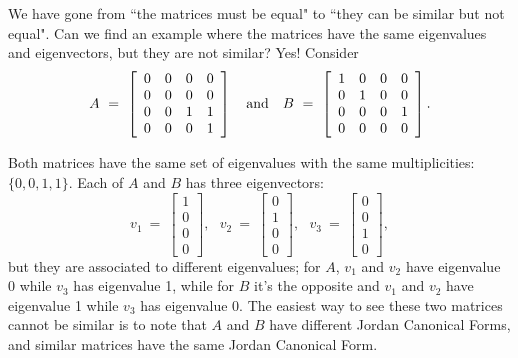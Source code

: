 \documentclass{article}
\newcommand{\vect}[1]{#1}%
\newcommand{\vecfour}[4]
{\left[\begin{array}{c}
                        #1   \\
                        #2   \\
                        #3   \\
                        #4
\end{array}\right] }
\begin{document}
We have gone from ``the matrices must be equal" to ``they can be similar but not equal". Can we find an example where the matrices have the same eigenvalues and eigenvectors, but they are not similar? Yes! Consider
\begin{equation}\label{eq:ABsameevvnotsamejcc} A \ = \
\left[\begin{array}{cccc}
0 & 0 & 0 & 0 \\
0 & 0 & 0 & 0 \\
0 & 0 & 1 & 1 \\
0 & 0 & 0 & 1
\end{array}\right] \ \ \ {\rm and}\ \ \ B \ = \ \left[\begin{array}{cccc}
1 & 0 & 0 & 0 \\
0 & 1 & 0 & 0 \\
0 & 0 & 0 & 1 \\
0 & 0 & 0 & 0 \\
\end{array}\right].
\end{equation}

Both matrices have the same set of eigenvalues with the same multiplicities: $\{0, 0, 1, 1\}$. Each of $A$ and $B$ has three eigenvectors:
\begin{equation}
    \vect{v_1} \ = \ \vecfour{1}{0}{0}{0}, \ \ \
    \vect{v_2} \ = \ \vecfour{0}{1}{0}{0}, \ \ \
    \vect{v_3} \ = \ \vecfour{0}{0}{1}{0},
\end{equation}
but they are associated to different eigenvalues; for $A$,  $\vect{v_1}$ and $\vect{v_2}$ have eigenvalue 0 while $\vect{v_3}$ has eigenvalue 1, while for $B$ it's the opposite and $\vect{v_1}$ and $\vect{v_2}$ have eigenvalue 1 while $\vect{v_3}$ has eigenvalue 0. The easiest way to see these two matrices cannot be similar is to note that $A$ and $B$ have different   Jordan Canonical Forms, and similar matrices have the same Jordan Canonical Form.
\end{document}
